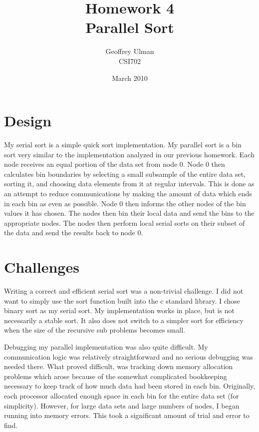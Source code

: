 \documentclass{article}
\begin{document}
\title{Homework 4\\
       Parallel Sort}
\author{Geoffrey Ulman\\
        CSI702}
\date{March 2010}
\maketitle

\section{Design}
My serial sort is a simple quick sort implementation. My parallel sort is a bin sort very similar to the implementation analyzed in our previous homework. Each node receives an equal portion of the data set from node 0. Node 0 then calculates bin boundaries by selecting a small subsample of the entire data set, sorting it, and choosing data elements from it at regular intervals. This is done as an attempt to reduce communications by making the amount of data which ends in each bin as even as possible. Node 0 then informs the other nodes of the bin values it has chosen. The nodes then bin their local data and send the bins to the appropriate nodes. The nodes then perform local serial sorts on their subset of the data and send the results back to node 0.

\section{Challenges}
Writing a correct and efficient serial sort was a non-trivial challenge. I did not want to simply use the sort function built into the c standard library. I chose binary sort as my serial sort. My implementation works in place, but is not necessarily a stable sort. It also does not switch to a simpler sort for efficiency when the size of the recursive sub problems becomes small.

Debugging my parallel implementation was also quite difficult. My communication logic was relatively straightforward and no serious debugging was needed there. What proved difficult, was tracking down memory allocation problems which arose because of the somewhat complicated bookkeeping necessary to keep track of how much data had been stored in each bin. Originally, each processor allocated enough space in each bin for the entire data set (for simplicity). However, for large data sets and large numbers of nodes, I began running into memory errors. This took a significant amount of trial and error to find.
\end{document}
